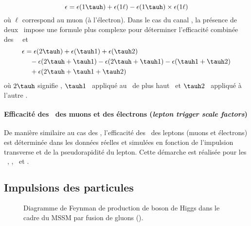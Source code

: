 \begin{equation}
\epsilon = \epsilon(1\tauh) + \epsilon(1\ell) - \epsilon(1\tauh) \times \epsilon(1\ell)
\end{equation}
où $\ell$ correspond au muon (à l'électron).
Dans le cas du canal \tauh\tauh, la présence de deux \tauh\ impose une formule plus complexe pour déterminer l'efficacité combinée des \HLTpaths\ \HLTSingleTau\ et \HLTDoubleTau\,
\begin{align}
\epsilon &= \epsilon(2\tauh) + \epsilon(\tauh1) + \epsilon(\tauh2)
\nonumber\\ & \hphantom{=}
- \epsilon(2\tauh + \tauh1) - \epsilon(2\tauh + \tauh1) - \epsilon(\tauh1+\tauh2)
\nonumber\\ & \hphantom{=}
+ \epsilon(2\tauh + \tauh1 + \tauh2)
\end{align}
où $2\tauh$ signifie \HLTDoubleTau,
$\tauh1$ \HLTSingleTau\ appliqué au \tauh\ de plus haut \pT\ et
$\tauh2$ \HLTSingleTau\ appliqué à l'autre \tauh.
\paragraph{Efficacité des \HLTpaths\ des muons et des électrons (\emph{lepton trigger scale factors})}
De manière similaire au cas des \tauh, l'efficacité des \HLTpaths\ des leptons (muons et électrons) est déterminée dans les données réelles et simulées en fonction de l'impulsion transverse et de la pseudorapidité du lepton.
Cette démarche est réalisée pour les \HLTpaths\ \HLTSingleMu, \HLTSingleEle, \HLTMuTauCross\ et \HLTEleTauCross.
\subsection{Impulsions des particules}
\begin{wrapfigure}{R}{5cm}
\vspace{\baselineskip}
\centering
\vspace{\baselineskip}
\caption[Production de boson de Higgs du MSSM par fusion de gluons.]{Diagramme de Feynman de production de boson de Higgs dans le cadre du MSSM par fusion de gluons (\gluon\gluon\Higgs).}
\label{fig-chapter-HTT_analysis-section-corrections-fgraph-gg_loop_hHA}
\end{wrapfigure}

